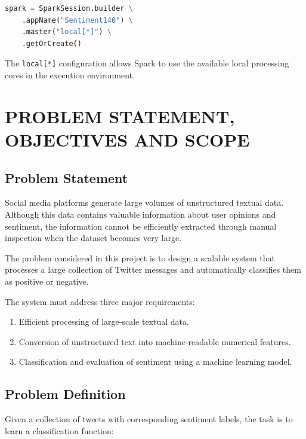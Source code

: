 \documentclass[12pt,a4paper]{article}
\begin{document}
\begin{lstlisting}[language=Python]
spark = SparkSession.builder \
    .appName("Sentiment140") \
    .master("local[*]") \
    .getOrCreate()
\end{lstlisting}

The \texttt{local[*]} configuration allows Spark to use the available local processing cores in the execution environment.


\newpage
\section{PROBLEM STATEMENT, OBJECTIVES AND SCOPE}

\subsection{Problem Statement}

Social media platforms generate large volumes of unstructured textual data. Although this data contains valuable information about user opinions and sentiment, the information cannot be efficiently extracted through manual inspection when the dataset becomes very large.

The problem considered in this project is to design a scalable system that processes a large collection of Twitter messages and automatically classifies them as positive or negative.

The system must address three major requirements:

\begin{enumerate}
    \item Efficient processing of large-scale textual data.
    \item Conversion of unstructured text into machine-readable numerical features.
    \item Classification and evaluation of sentiment using a machine learning model.
\end{enumerate}

\subsection{Problem Definition}

Given a collection of tweets with corresponding sentiment labels, the task is to learn a classification function:
\end{document}
